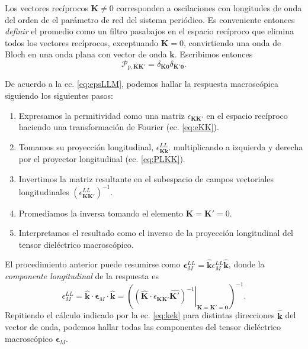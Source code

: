 \documentclass[12pt]{article}
\begin{document}
Los vectores recíprocos $\bm K\ne0$ corresponden a oscilaciones
con longitudes de onda del orden de el parámetro de red del sistema
periódico. Es conveniente entonces {\em definir} el promedio como
un filtro pasabajos en el espacio recíproco que elimina todos los vectores
recíprocos, exceptuando $\bm K=0$, convirtiendo una onda de Bloch en
una onda plana con vector de onda $\bm k$. Escribimos entonces
\begin{equation}
  \label{eq:PaKK}
  \mathcal P_{p,\bm K\bm K'}=\delta_{\bm K\bm 0}\delta_{\bm K'\bm0}.
\end{equation}

De acuerdo a la ec. \eqref{eq:epsLLM}, podemos hallar la respuesta
macroscópica siguiendo los siguientes pasos:
\begin{enumerate}
\item Expresamos la permitividad como una matriz $\epsilon_{\bm K\bm
    K'}$ en el espacio recíproco haciendo una
  transformación de Fourier (ec. \eqref{eq:eKK}).
\item Tomamos su proyección longitudinal, $\epsilon^{LL}_{\bm K\bm
    k'}$  multiplicando a izquierda y derecha por el proyector
  longitudinal (ec. \eqref{eq:PLKK}).
\item Invertimos la matriz resultante en el subespacio de campos
  vectoriales longitudinales $\left(\epsilon^{LL}_{\bm K\bm K'}\right)^{-1}$.
\item Promediamos la inversa tomando el elemento $\bm K=\bm K'=0$.
\item Interpretamos el resultado como el inverso de la proyección
  longitudinal del tensor dieléctrico macroscópico.
\end{enumerate}
El procedimiento anterior puede resumirse como
$\bm\epsilon^{LL}_M=\hat{\bm k}\epsilon^{LL}_M\hat{\bm k}$, donde la
{\em componente longitudinal} de la respuesta es
\begin{equation}
  \label{eq:kek}
  \epsilon_M^{LL}=\hat{\bm k}\cdot\bm\epsilon_M\cdot\hat{\bm k}=\left(\left.\left(\hat{\bm
    K}\cdot\epsilon_{\bm K\bm K'}\hat{\bm
    K'}\right)^{-1}\right|_{\bm K=\bm K'=\bm 0}\right)^{-1}.
\end{equation}
Repitiendo el cálculo indicado por la ec. \eqref{eq:kek} para
distintas direcciones $\hat{\bm k}$ del vector de onda, podemos hallar
todas las componentes del tensor dieléctrico macroscópico
$\bm\epsilon_M$.
\end{document}
